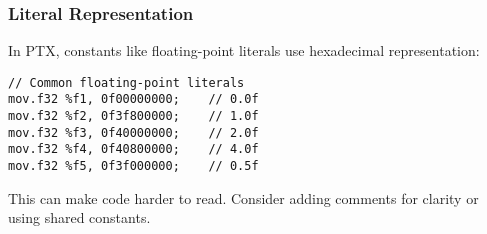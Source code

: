\subsubsection{Literal Representation}

In PTX, constants like floating-point literals use hexadecimal representation:

\begin{lstlisting}[style=ptx]
// Common floating-point literals
mov.f32 %f1, 0f00000000;    // 0.0f
mov.f32 %f2, 0f3f800000;    // 1.0f
mov.f32 %f3, 0f40000000;    // 2.0f
mov.f32 %f4, 0f40800000;    // 4.0f
mov.f32 %f5, 0f3f000000;    // 0.5f
\end{lstlisting}

This can make code harder to read. Consider adding comments for clarity or using shared constants.

